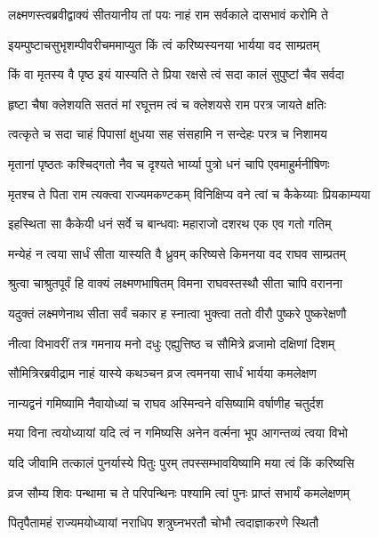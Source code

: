 \twolineshloka
{लक्ष्मणस्त्वब्रवीद्वाक्यं सीतयानीय तां पयः}
{नाहं राम सर्वकाले दासभावं करोमि ते} %

\twolineshloka
{इयम्पुष्टाचसुभृशम्पीवरीचममाप्युत}
{किं त्वं करिष्यस्यनया भार्यया वद साम्प्रतम्} %

\twolineshloka
{किं वा मृतस्य वै पृष्ठ इयं यास्यति ते प्रिया}
{रक्षसे त्वं सदा कालं सुपुष्टां चैव सर्वदा} %

\twolineshloka
{हृष्टा चैषा क्लेशयति सततं मां रघूत्तम}
{त्वं च क्लेशयसे राम परत्र जायते क्षतिः} %

\twolineshloka
{त्वत्कृते च सदा चाहं पिपासां क्षुधया सह}
{संसहामि न सन्देहः परत्र च निशामय} %

\twolineshloka
{मृतानां पृष्ठतः कश्चिद्गतो नैव च दृश्यते}
{भार्य्या पुत्रो धनं चापि एवमाहुर्मनीषिणः} %

\twolineshloka
{मृतश्च ते पिता राम त्यक्त्वा राज्यमकण्टकम्}
{विनिक्षिप्य वने त्वां च कैकेय्याः प्रियकाम्यया} %

\twolineshloka
{इहस्थिता सा कैकेयी धनं सर्वे च बान्धवाः}
{महाराजो दशरथ एक एव गतो गतिम्} %

\twolineshloka
{मन्येहं न त्वया सार्धं सीता यास्यति वै ध्रुवम्}
{करिष्यसे किमनया वद राघव साम्प्रतम्} %

\twolineshloka
{श्रुत्वा चाश्रुतपूर्वं हि वाक्यं लक्ष्मणभाषितम्}
{विमना राघवस्तस्थौ सीता चापि वरानना} %

\twolineshloka
{यदुक्तं लक्ष्मणेनाथ सीता सर्वं चकार ह}
{स्नात्वा भुक्त्वा ततो वीरौ पुष्करे पुष्करेक्षणौ} %

\twolineshloka
{नीत्वा विभावरीं तत्र गमनाय मनो दधुः}
{एह्युत्तिष्ठ च सौमित्रे व्रजामो दक्षिणां दिशम्} %

\twolineshloka
{सौमित्रिरब्रवीद्राम नाहं यास्ये कथञ्चन}
{व्रज त्वमनया सार्धं भार्यया कमलेक्षण} %

\twolineshloka
{नान्यद्वनं गमिष्यामि नैवायोध्यां च राघव}
{अस्मिन्वने वसिष्यामि वर्षाणीह चतुर्दश} %

\twolineshloka
{मया विना त्वयोध्यायां यदि त्वं न गमिष्यसि}
{अनेन वर्त्मना भूप आगन्तव्यं त्वया विभो} %

\twolineshloka
{यदि जीवामि तत्कालं पुनर्यास्ये पितुः पुरम्}
{तपस्सम्भावयिष्यामि मया त्वं किं करिष्यसि} %

\twolineshloka
{व्रज सौम्य शिवः पन्थामा च ते परिपन्थिनः}
{पश्यामि त्वां पुनः प्राप्तं सभार्यं कमलेक्षणम्} %

\twolineshloka
{पितृपैतामहं राज्यमयोध्यायां नराधिप}
{शत्रुघ्नभरतौ चोभौ त्वदाज्ञाकरणे स्थितौ} %

